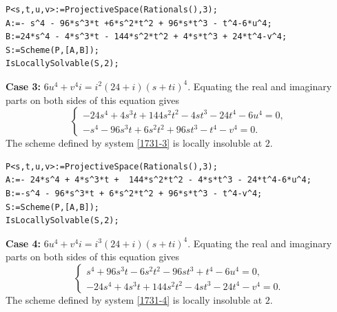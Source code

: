 \documentclass[a4paper,12pt,english,reqno]{amsart}
\begin{document}
\begin{lstlisting}
P<s,t,u,v>:=ProjectiveSpace(Rationals(),3);
A:=- s^4 - 96*s^3*t +6*s^2*t^2 + 96*s*t^3 - t^4-6*u^4;
B:=24*s^4 - 4*s^3*t - 144*s^2*t^2 + 4*s*t^3 + 24*t^4-v^4;
S:=Scheme(P,[A,B]);
IsLocallySolvable(S,2);
\end{lstlisting}

{\bf Case 3:} $6u^4+v^4i=i^2(24+i)(s+ti)^4$. Equating the real and imaginary parts on both sides of this equation gives
\begin{equation}\label{1731-3}
\begin{cases}
-24s^4 + 4s^3t + 144s^2t^2 - 4st^3 - 24t^4 - 6u^4=0,\\
-s^4 - 96s^3t + 6s^2t^2 + 96st^3 - t^4 - v^4=0.
\end{cases}
\end{equation}
The scheme defined by system \eqref{1731-3} is locally insoluble at $2$.


\begin{lstlisting}
P<s,t,u,v>:=ProjectiveSpace(Rationals(),3);
A:=- 24*s^4 + 4*s^3*t +  144*s^2*t^2 - 4*s*t^3 - 24*t^4-6*u^4;
B:=-s^4 - 96*s^3*t + 6*s^2*t^2 + 96*s*t^3 - t^4-v^4;
S:=Scheme(P,[A,B]);
IsLocallySolvable(S,2);
\end{lstlisting}

{\bf Case 4:} $6u^4+v^4i=i^3(24+i)(s+ti)^4$. Equating the real and imaginary parts on both sides of this equation gives
\begin{equation}\label{1731-4}
\begin{cases}
s^4 + 96s^3t - 6s^2t^2 - 96st^3 + t^4 - 6u^4=0,\\
-24s^4 + 4s^3t + 144s^2t^2 - 4st^3 - 24t^4 - v^4=0.
\end{cases}
\end{equation}
The scheme defined by system \eqref{1731-4} is locally insoluble at $2$.

\end{document}
